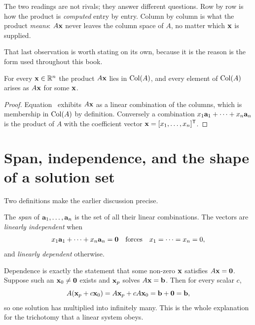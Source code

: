 \begin{remark}
The two readings are not rivals; they answer different questions. Row by row is
how the product is \emph{computed} entry by entry. Column by column is what the
product \emph{means}: \(A\mathbf{x}\) never leaves the column space of \(A\), no
matter which \(\mathbf{x}\) is supplied.
\end{remark}

That last observation is worth stating on its own, because it is the reason
 is the form used throughout this book.

\begin{proposition}
For every \(\mathbf{x}\in\mathbb{R}^{n}\) the product \(A\mathbf{x}\) lies in
\(\operatorname{Col}(A)\), and every element of \(\operatorname{Col}(A)\) arises as \(A\mathbf{x}\) for some
\(\mathbf{x}\).
\end{proposition}

\begin{proof}
Equation~ exhibits \(A\mathbf{x}\) as a linear combination
of the columns, which is membership in \(\operatorname{Col}(A)\) by definition. Conversely a
combination \(x_1\mathbf{a}_1+\cdots+x_n\mathbf{a}_n\) is the product of \(A\) with
the coefficient vector \(\mathbf{x}=[x_1,\ldots,x_n]^{\mathsf{T}}\).
\end{proof}

\section{Span, independence, and the shape of a solution set}

Two definitions make the earlier discussion precise.

\begin{definition}
The \emph{span} of \(\mathbf{a}_1,\ldots,\mathbf{a}_n\) is the set of all their
linear combinations. The vectors are \emph{linearly independent} when
\[
	x_1\mathbf{a}_1+\cdots+x_n\mathbf{a}_n=\mathbf{0}
	\quad\text{forces}\quad
	x_1=\cdots=x_n=0 ,
\]
and \emph{linearly dependent} otherwise.
\end{definition}


Dependence is exactly the statement that some non-zero \(\mathbf{x}\) satisfies
\(A\mathbf{x}=\mathbf{0}\). Suppose such an \(\mathbf{x}_0\neq\mathbf{0}\) exists and
\(\mathbf{x}_p\) solves \(A\mathbf{x}=\mathbf{b}\). Then for every scalar \(c\),
\[
	A(\mathbf{x}_p+c\mathbf{x}_0)=A\mathbf{x}_p+cA\mathbf{x}_0=\mathbf{b}+\mathbf{0}=\mathbf{b},
\]
so one solution has multiplied into infinitely many. This is the whole
explanation for the trichotomy that a linear system obeys.

